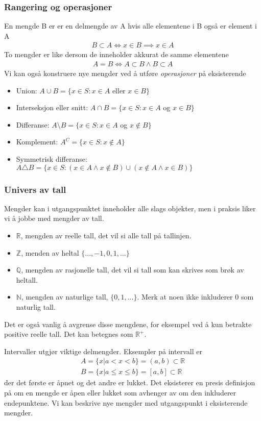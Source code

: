 \subsubsection{Rangering og operasjoner}
En mengde B er er en delmengde av A hvis alle elementene i B også er element i A
\begin{align}
B \subset A \iff x \in B \implies x \in A
\end{align}
To mengder er like dersom de inneholder akkurat de samme elementene
\begin{align}
A=B \iff A \subset B \land B \subset A
\end{align}
Vi kan også konstruere nye mengder ved å utføre \textit{operasjoner} på eksisterende
\begin{itemize}
\item Union: $ A \cup B = \{x\in S:x \in A$ eller $x \in B \}$
\item Interseksjon eller snitt: $A \cap B = \{x\in S:x \in A$ og $x \in B \}$
\item Differanse: $ A \setminus B = \{x\in S:x \in A$ og $x \notin B \}$
\item Komplement: $A^C = \{x\in S:x \notin A\}$
\item Symmetrisk differanse: $A\triangle B = \{x\in S: (x\in A \land x\notin B)\cup(x\notin A \land x\in B)\}$
\end{itemize} 
\subsubsection{Univers av tall}
Mengder kan i utgangspunktet inneholder alle slags objekter, men i praksis liker vi å jobbe med mengder av tall. 
\begin{itemize}
\item $\mathbb{R}$, mengden av reelle tall, det vil si alle tall på tallinjen.
\item $\mathbb{Z}$, menden av heltal $\{...,-1,0,1,...\}$
\item $\mathbb{Q}$, mengden av rasjonelle tall, det vil si tall som kan skrives som brøk av heltall.
\item $\mathbb{N}$, mengden av naturlige tall, $\{0,1,...\}$. Merk at noen ikke inkluderer 0 som naturlig tall.
\end{itemize}
Det er også vanlig å avgrense disse mengdene, for eksempel ved å kun betrakte positive reelle tall. Det kan betegnes som $\mathbb{R}^+$. 

Intervaller utgjør viktige delmengder. Eksempler på intervall er
\begin{align}
A = \{x| a < x < b \} = (a,b) \subset \mathbb{R} \\
B = \{x| a \leq x \leq b \} = [a,b] \subset \mathbb{R}
\end{align}
der det første er åpnet og det andre er lukket. Det eksisterer en presis definisjon på om en mengde er åpen eller lukket som avhenger av om den inkluderer endepunktene. Vi kan beskrive nye mengder med utgangspunkt i eksisterende mengder.
